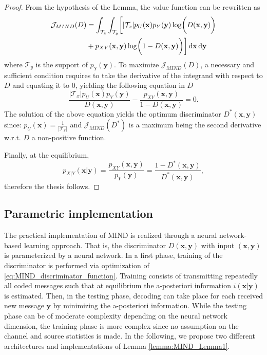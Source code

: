 \begin{proof}
From the hypothesis of the Lemma, the value function can be rewritten as
\begin{align}
\label{eq:MIND_Lebesgue1}
\mathcal{J}_{MIND}(D) &= \int_{\mathcal{T}_x} \int_{\mathcal{T}_y}\biggl[|\mathcal{T}_x|p_{U}(\mathbf{x})p_Y(\mathbf{y}) \log \biggl(D(\mathbf{x},\mathbf{y})\biggr) \nonumber \\ 
&+ p_{XY}(\mathbf{x},\mathbf{y}) \log \biggl(1-D(\mathbf{x},\mathbf{y})\biggr)\biggr] \mathop{}\!\mathrm{d} \mathbf{x} \mathop{}\!\mathrm{d} \mathbf{y}
\end{align}
where $\mathcal{T}_y$ is the support of $p_Y(\mathbf{y})$.
To maximize $\mathcal{J}_{MIND}(D)$, a necessary and sufficient condition requires to take the derivative of the integrand with respect to $D$ and equating it to $0$, yielding the following equation in $D$
\begin{equation}
\frac{|\mathcal{T}_x|p_{U}(\mathbf{x})p_Y(\mathbf{y})}{D(\mathbf{x},\mathbf{y})} -\frac{p_{XY}(\mathbf{x},\mathbf{y})}{1-D(\mathbf{x},\mathbf{y})} =0.
\end{equation}
The solution of the above equation yields the optimum discriminator $D^*(\mathbf{x},\mathbf{y})$ since: $p_U(\mathbf{x})=\frac{1}{|\mathcal{T}_x|}$ and $\mathcal{J}_{MIND}(D^*)$ is a maximum being the second derivative w.r.t. $D$ a non-positive function.

Finally, at the equilibrium, 
\begin{equation}
p_{X|Y}(\mathbf{x}|\mathbf{y})=\frac{p_{XY}(\mathbf{x},\mathbf{y})}{p_{Y}(\mathbf{y})} = \frac{1-D^*(\mathbf{x},\mathbf{y})}{D^*(\mathbf{x},\mathbf{y})},
\end{equation}
therefore the thesis follows.
\end{proof}

\subsection{Parametric implementation}
\label{subsec:mind_implementation}
The practical implementation of MIND is realized through a neural network-based learning approach. That is, the discriminator $D(\mathbf{x},\mathbf{y})$ with input $(\mathbf{x},\mathbf{y})$ is parameterized by a neural network. In a first phase, training of the discriminator is performed via optimization of \eqref{eq:MIND_discriminator_function}.
Training consists of transmitting repeatedly all coded messages such that at equilibrium the a-posteriori information $i(\mathbf{x}|\mathbf{y})$ is estimated. Then, in the testing phase, decoding can take place for each received new message $\mathbf{y}$ by minimizing the a-posteriori information. 
While the testing phase can be of moderate complexity depending on the neural network dimension, the training phase is more complex since no assumption on the channel and source statistics is made. In the following, we propose two different architectures and implementations of Lemma \ref{lemma:MIND_Lemma1}.

